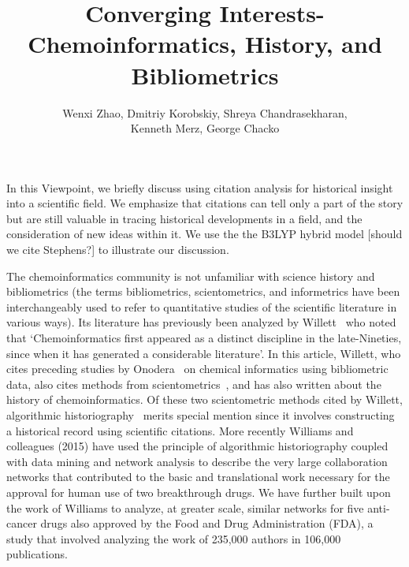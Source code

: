\documentclass[11pt, oneside]{article}   	%
\title{Converging Interests- Chemoinformatics, History, and Bibliometrics}
\author{Wenxi Zhao, Dmitriy Korobskiy, Shreya Chandrasekharan, \\Kenneth Merz, George Chacko}
\begin{document}
\maketitle

In this Viewpoint, we briefly discuss using citation analysis for historical insight into a scientific field. We emphasize that citations can tell only a part of the story but are still valuable in tracing historical developments in a field, and the consideration of new ideas within it. We use the the B3LYP hybrid model [should we cite Stephens?] to illustrate our discussion. 

The chemoinformatics community is not unfamiliar with science history and bibliometrics (the terms bibliometrics, scientometrics, and informetrics have been interchangeably used to refer to quantitative studies of the scientific literature in various ways\citep{debellis2009}). Its literature has previously been analyzed by Willett~\citep{willett2008} who noted that `Chemoinformatics first appeared as a distinct discipline in the late-Nineties, since when it has generated a considerable literature'. In this article, Willett, who cites preceding studies by Onodera~\citep{onodera2001,onodera2003} on chemical informatics using bibliometric data, also cites methods from scientometrics~\citep{garfield2004,leydesdorff2007}, and has also written about the history of chemoinformatics\citep{willett2003}. Of these two scientometric methods cited by Willett, algorithmic historiography~\citep{garfield2004} merits special mention since it involves constructing a historical record using scientific citations. More recently Williams and colleagues (2015)\citep{williams2015scientific} have used the principle of algorithmic historiography coupled with data mining and network analysis to describe the very large collaboration networks that contributed to the basic and translational work necessary for the approval for human use of two breakthrough drugs. We\citep{keserci2017research} have further built upon the work of Williams to analyze, at greater scale, similar networks for five anti-cancer drugs also approved by the Food and Drug Administration (FDA), a study that involved analyzing the work of 235,000 authors in 106,000 publications.
\end{document}
